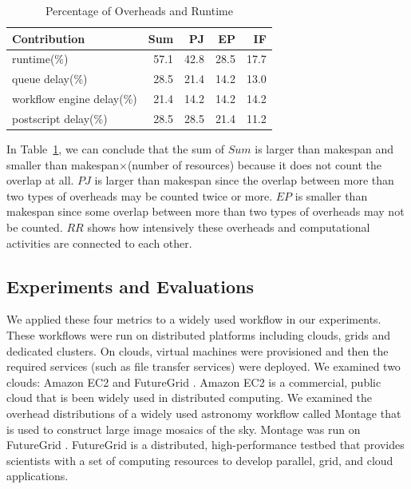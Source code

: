 \begin{table}[h!]
\caption{Percentage of Overheads and Runtime}
\label{tab:model_percentage_overhead}
\centering
\begin{tabular}{lrrrr}
\hline
Contribution & Sum & PJ & EP &IF\\

\hline

runtime(\%) & 57.1 & 42.8 & 28.5 &17.7 \\
queue delay(\%) & 28.5 &21.4 &14.2 &13.0 \\
workflow engine delay(\%) & 21.4 &14.2& 14.2 &14.2\\
postscript delay(\%) & 28.5 & 28.5 & 21.4 & 11.2 \\
\hline
\end{tabular}
\end{table} 


In Table~\ref{tab:model_percentage_overhead}, we can conclude that the sum of $Sum$ is larger than makespan and smaller than makespan$\times$(number of resources) because it does not count the overlap at all. $PJ$ is larger than makespan since the overlap between more than two types of overheads may be counted twice or more. $EP$ is smaller than makespan since some overlap between more than two types of overheads may not be counted.  $RR$ shows how intensively these overheads and computational activities are connected to each other. 

\subsection{Experiments and Evaluations}

We applied these four metrics to a widely used workflow in our experiments. These workflows were run on distributed platforms including clouds, grids and dedicated clusters. 
On clouds, virtual machines were provisioned and then the required services (such as file transfer services) were deployed. 
We examined two clouds: Amazon EC2 \cite{AmazonEC2}  and FutureGrid \cite{FutureGrid}. Amazon EC2 is a commercial, public cloud that is been widely used in distributed computing. 
We examined the overhead distributions of a widely used astronomy workflow called Montage \cite{Berriman2004} that is used to construct large image mosaics of the sky. Montage was run on FutureGrid \cite{FutureGrid}. FutureGrid is a distributed, high-performance testbed that provides scientists with a set of computing resources to develop parallel, grid, and cloud applications. 

